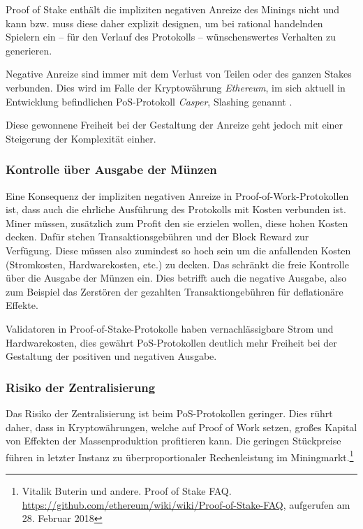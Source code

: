 Proof of Stake enthält die impliziten negativen Anreize des Minings nicht und kann bzw. muss diese daher explizit designen, um bei rational handelnden Spielern ein -- für den Verlauf des Protokolls -- wünschenswertes Verhalten zu generieren.

Negative Anreize sind immer mit dem Verlust von Teilen oder des ganzen Stakes verbunden. Dies wird im Falle der Kryptowährung \textit{Ethereum}, im sich aktuell in Entwicklung befindlichen PoS-Protokoll \textit{Casper}, Slashing genannt \cite[S. 4f.]{casper_ffg}. 

Diese gewonnene Freiheit bei der Gestaltung der Anreize geht jedoch mit einer Steigerung der Komplexität einher.

\subsubsection{Kontrolle über Ausgabe der Münzen}

Eine Konsequenz der impliziten negativen Anreize in Proof-of-Work-Protokollen ist, dass auch die ehrliche Ausführung des Protokolls mit Kosten verbunden ist.
Miner müssen, zusätzlich zum Profit den sie erzielen wollen, diese hohen Kosten decken. 
Dafür stehen Transaktionsgebühren und der Block Reward zur Verfügung. Diese müssen also zumindest so hoch sein um die anfallenden Kosten (Stromkosten, Hardwarekosten, etc.) zu decken. Das schränkt die freie Kontrolle über die Ausgabe der Münzen ein. Dies betrifft auch die negative Ausgabe, also zum Beispiel das Zerstören der gezahlten Transaktiongebühren für deflationäre Effekte.

Validatoren in Proof-of-Stake-Protokolle haben vernachlässigbare Strom und Hardwarekosten, dies gewährt PoS-Protokollen deutlich mehr Freiheit bei der Gestaltung der positiven und negativen Ausgabe.

\subsubsection{Risiko der Zentralisierung}

Das Risiko der Zentralisierung ist beim PoS-Protokollen geringer. 
Dies rührt daher, dass in Kryptowährungen, welche auf Proof of Work setzen, großes Kapital von Effekten der Massenproduktion profitieren kann.
Die geringen Stückpreise führen in letzter Instanz zu überproportionaler Rechenleistung im Miningmarkt.\footnote{Vitalik Buterin und andere. Proof of Stake FAQ. \url{https://github.com/ethereum/wiki/wiki/Proof-of-Stake-FAQ}, aufgerufen am 28. Februar 2018}


